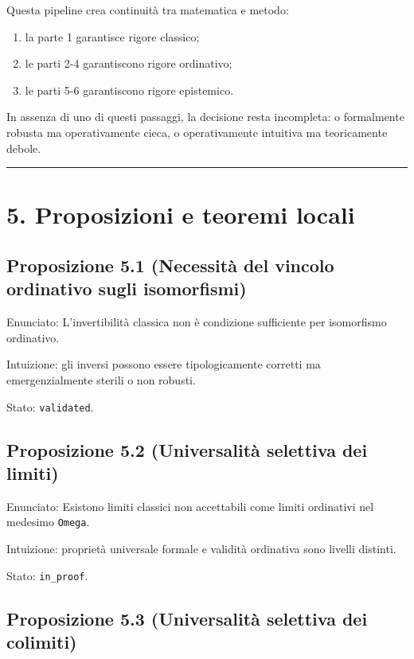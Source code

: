 Questa pipeline crea continuità tra matematica e metodo:

\begin{enumerate}
\def\labelenumi{\arabic{enumi}.}
\tightlist
\item
  la parte 1 garantisce rigore classico;
\item
  le parti 2-4 garantiscono rigore ordinativo;
\item
  le parti 5-6 garantiscono rigore epistemico.
\end{enumerate}

In assenza di uno di questi passaggi, la decisione resta incompleta: o formalmente robusta ma operativamente cieca, o operativamente intuitiva ma teoricamente debole.

\begin{center}\rule{0.5\linewidth}{0.5pt}\end{center}

\section{5. Proposizioni e teoremi locali}

\subsection{Proposizione 5.1 (Necessità del vincolo ordinativo sugli isomorfismi)}

Enunciato:
L'invertibilità classica non è condizione sufficiente per isomorfismo ordinativo.

Intuizione:
gli inversi possono essere tipologicamente corretti ma emergenzialmente sterili o non robusti.

Stato: \texttt{validated}.

\subsection{Proposizione 5.2 (Universalità selettiva dei limiti)}

Enunciato:
Esistono limiti classici non accettabili come limiti ordinativi nel medesimo \texttt{Omega}.

Intuizione:
proprietà universale formale e validità ordinativa sono livelli distinti.

Stato: \texttt{in\_proof}.

\subsection{Proposizione 5.3 (Universalità selettiva dei colimiti)}

